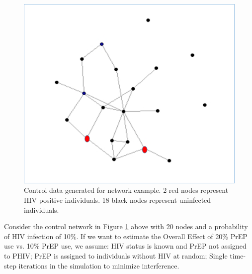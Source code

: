 \documentclass{article}
\theoremstyle{definition}
\begin{document}
\begin{figure}[H]
    \centering
    \includegraphics[scale=0.5]{Figures/Network Example 1.png}
    \caption{Control data generated for network example. 2 red nodes represent HIV positive individuals. 18 black nodes represent uninfected individuals.}
    \label{fig: Figure 2}
\end{figure}
Consider the control network in Figure \ref{fig: Figure 2}  above with 20 nodes and a probability of HIV infection of 10\%. If we want to estimate the Overall Effect of 20\% PrEP use vs. 10\% PrEP use, we assume: HIV status is known and PrEP not assigned to PHIV; PrEP is assigned to individuals without HIV at random; Single time-step iterations in the simulation to minimize interference.
\end{document}
